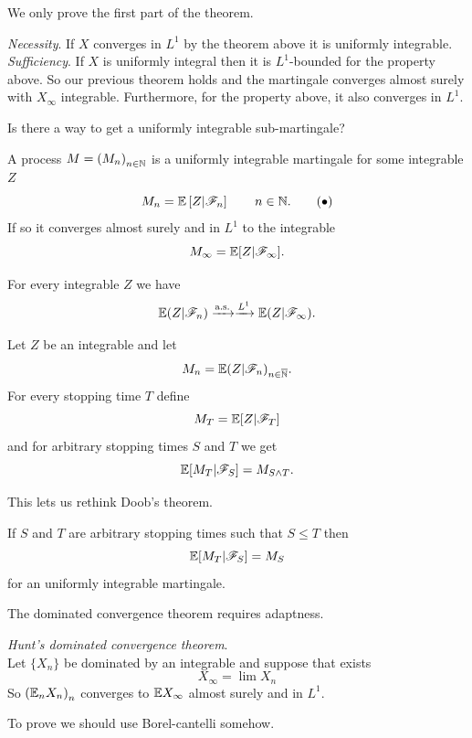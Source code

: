 \documentclass{report}
\begin{document}
We only prove the first part of the theorem.
\begin{fancyproof}
	\emph{Necessity}. If $X$ converges in $L^{1}$ by the theorem above it is uniformly integrable.\\
	\emph{Sufficiency}. If $X$ is uniformly integral then it is $L^{1}$-bounded for the property above. So our previous theorem holds and the martingale converges almost surely with $X_{\infty}$ integrable. Furthermore, for the property above, it also converges in $L^{1}$.
\end{fancyproof}
Is there a way to get a uniformly integrable sub-martingale?
\begin{theorem}
	A process $M={(M_{n})}_{n\in\mathbb{N}}$ is a uniformly integrable martingale \ifonly{} for some integrable \rv{} $Z$
	\begin{equation}
		M_{n}=\mathbb{E}\left[Z|\mathscr{F}_{n}\right]\qquad n\in\mathbb{N}.\tag{$\bullet$}\label{AAAA}
	\end{equation}
	If so it converges almost surely and in $L^{1}$ to the integrable \rv
	\begin{equation*}
		M_{\infty}=\mathbb{E}[Z|\mathscr{F}_{\infty}].
	\end{equation*}
\end{theorem}
\begin{corollary}
	For every integrable \rv{} $Z$ we have
	\begin{equation*}
		\mathbb{E}(Z|\mathscr{F}_{n})\xrightarrow[]{\text{a.s.}}\xrightarrow[]{L^{1}}\mathbb{E}(Z|\mathscr{F}_{\infty}).
	\end{equation*}
\end{corollary}
\begin{theorem}
	Let $Z$ be an integrable \rv{} and let 
	\begin{equation*}
		M_{n}=\mathbb{E}(Z|\mathscr{F}_{n})_{n\in\overline{\mathbb{N}}}.
	\end{equation*}
	For every stopping time $T$ define
	\begin{equation*}
		M_{T}=\mathbb{E}[Z|\mathscr{F}_{T}]
	\end{equation*}
	and for arbitrary stopping times $S$ and $T$ we get
	\begin{equation*}
		\mathbb{E}[M_{T}|\mathscr{F}_{S}]=M_{S\wedge T}.
	\end{equation*}
\end{theorem}
This lets us rethink Doob's theorem.
\begin{theorem}
	If $S$ and $T$ are arbitrary stopping times such that $S\leq T$ then
	\begin{equation*}
		\mathbb{E}[M_{T}|\mathscr{F}_{S}]=M_{S}
	\end{equation*}
	for an uniformly integrable martingale.
\end{theorem}
The dominated convergence theorem requires adaptness. 
\begin{theorem}
	\emph{Hunt's dominated convergence theorem}.\\
	Let $\{X_{n}\}$ be dominated by an integrable \rv{} and suppose that exists
	\begin{equation*}
		X_{\infty}=\lim X_{n}
	\end{equation*}
	So ${(\mathbb{E}_{n}X_{n})}_{n}$ converges to $\mathbb{E} X_{\infty}$ almost surely and in $L^{1}$.
\end{theorem}
To prove we should use Borel-cantelli somehow.
\end{document}
